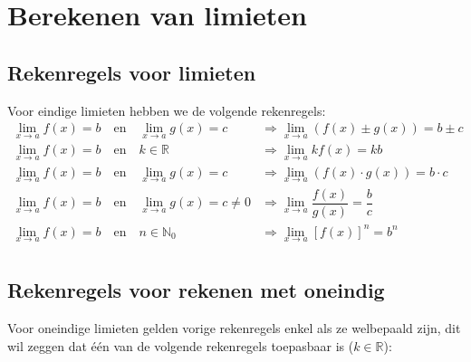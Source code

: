 \documentclass[12pt,twoside,a4paper]{article}
\begin{document}
\cleardoublepage
\section{Berekenen van limieten}

\subsection{Rekenregels voor limieten}

Voor eindige limieten hebben we de volgende rekenregels:
\begin{align*}
  \displaystyle\lim_{x\to a}f(x)=b\quad\mbox{en}\quad \lim_{x\to a}g(x)=c &\Rightarrow \lim_{x\to a}\left(f(x)\pm g(x)\right)=b\pm c\\
  \displaystyle\lim_{x\to a}f(x)=b\quad\mbox{en}\quad k\in\mathbb{R} &\Rightarrow \lim_{x\to a} kf(x)=kb\\
  \displaystyle\lim_{x\to a}f(x)=b\quad\mbox{en}\quad \lim_{x\to a}g(x)=c &\Rightarrow \lim_{x\to a}\left(f(x)\cdot g(x)\right)=b\cdot c\\
  \displaystyle\lim_{x\to a}f(x)=b\quad\mbox{en}\quad \lim_{x\to a}g(x)=c \neq 0 &\Rightarrow \lim_{x\to a}\dfrac{f(x)}{g(x)}=\dfrac{b}{c}\\
  \displaystyle\lim_{x\to a}f(x)=b\quad\mbox{en}\quad n\in\mathbb{N}_0 &\Rightarrow \lim_{x\to a} [f(x)]^n=b^n\\
\end{align*}

\subsection{Rekenregels voor rekenen met oneindig}

Voor oneindige limieten gelden vorige rekenregels enkel als ze welbepaald zijn, dit wil zeggen dat één van de volgende rekenregels toepasbaar is ($k\in\mathbb{R}$):
\end{document}
